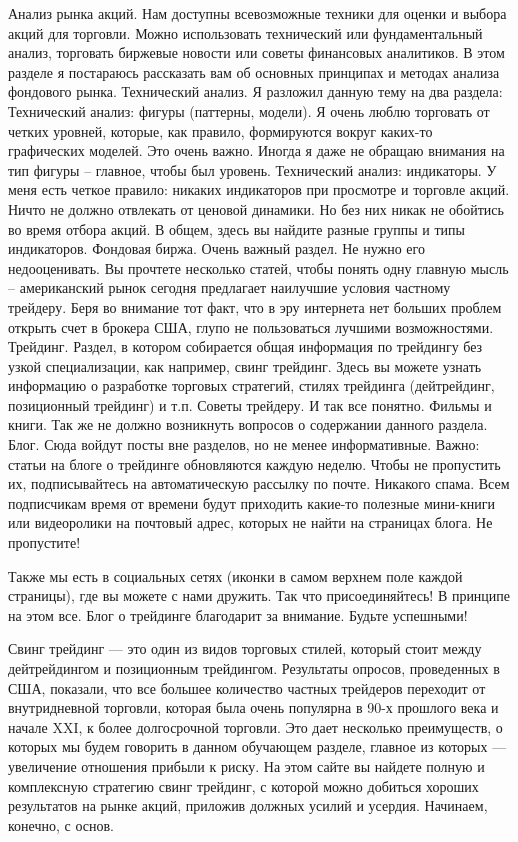 \documentclass[a5paper]{article}
\begin{document}
Анализ рынка акций. Нам доступны всевозможные техники для оценки и выбора акций для торговли. Можно использовать технический или фундаментальный анализ, торговать биржевые новости или советы финансовых аналитиков. В этом разделе я постараюсь рассказать вам об основных принципах и методах анализа фондового рынка.
Технический анализ. Я разложил данную тему на два раздела:
Технический анализ: фигуры (паттерны, модели). Я очень люблю торговать от четких уровней, которые, как правило, формируются вокруг каких-то графических моделей. Это очень важно. Иногда я даже не обращаю внимания на тип фигуры – главное, чтобы был уровень.
Технический анализ: индикаторы. У меня есть четкое правило: никаких индикаторов при просмотре и торговле акций. Ничто не должно отвлекать от ценовой динамики. Но без них никак не обойтись во время отбора акций. В общем, здесь вы найдите разные группы и типы индикаторов.
Фондовая биржа. Очень важный раздел. Не нужно его недооценивать. Вы прочтете несколько статей, чтобы понять одну главную мысль – американский рынок сегодня предлагает наилучшие условия частному трейдеру. Беря во внимание тот факт, что в эру интернета нет больших проблем открыть счет в брокера США, глупо не пользоваться лучшими возможностями.
Трейдинг. Раздел, в котором собирается общая информация по трейдингу без узкой специализации, как например, свинг трейдинг. Здесь вы можете узнать информацию о разработке торговых стратегий, стилях трейдинга (дейтрейдинг, позиционный трейдинг) и т.п.
Советы трейдеру. И так все понятно.
Фильмы и книги. Так же не должно возникнуть вопросов о содержании данного раздела.
Блог. Сюда войдут посты вне разделов, но не менее информативные.
Важно: статьи на блоге о трейдинге обновляются каждую неделю. Чтобы не пропустить их, подписывайтесь на автоматическую рассылку по почте. Никакого спама. Всем подписчикам время от времени будут приходить какие-то полезные мини-книги или видеоролики на почтовый адрес, которых не найти на страницах блога. Не пропустите!

Также мы есть в социальных сетях (иконки в самом верхнем поле каждой страницы), где вы можете с нами дружить. Так что присоединяйтесь! В принципе на этом все. Блог о трейдинге благодарит за внимание. Будьте успешными!

Свинг трейдинг — это один из видов торговых стилей, который стоит между дейтрейдингом и позиционным трейдингом. Результаты опросов, проведенных в США, показали, что все большее количество частных трейдеров переходит от внутридневной торговли, которая была очень популярна в 90-х прошлого века и начале XXI, к более долгосрочной торговли. Это дает несколько преимуществ, о которых мы будем говорить в данном обучающем разделе, главное из которых — увеличение отношения прибыли к риску. На этом сайте вы найдете полную и комплексную стратегию свинг трейдинг, с которой можно добиться хороших результатов на рынке акций, приложив должных усилий и усердия. Начинаем, конечно, с основ.
\end{document}
